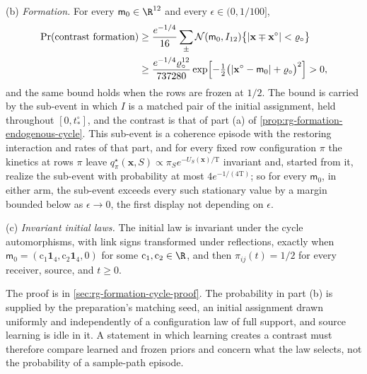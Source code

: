 (b) \emph{Formation.} For every \(\mathsf m_0\in\R^{12}\) and every
\(\epsilon\in(0,1/100]\),
\[
\begin{aligned}
\Pr(\text{contrast formation})
&\ge\frac{e^{-1/4}}{16}\sum_{\pm}\mathcal N(\mathsf m_0,I_{12})
\bigl\{|\mathbf x\mp\mathbf x^\circ|<\varrho_\circ\bigr\}\\
&\ge\frac{e^{-1/4}\varrho_\circ^{12}}{737280}
\exp\Bigl[-\tfrac12\bigl(|\mathbf x^\circ-\mathsf m_0|+\varrho_\circ\bigr)^2\Bigr]>0,
\end{aligned}
\]
and the same bound holds when the rows are frozen at \(1/2\). The bound is
carried by the sub-event in which \(I\) is a matched pair of the initial
assignment, held throughout \([0,t^\circ_*]\), and the contrast is that of
part (a) of \cref{prop:rg-formation-endogenous-cycle}. This sub-event is a
coherence episode with the restoring interaction and rates of that part, and
for every fixed row configuration \(\pi\) the kinetics at rows \(\pi\) leave
\(q^\star_\pi(\mathbf x,S)\propto\pi_Se^{-U_S(\mathbf x)/\mathrm T}\) invariant
and, started from it, realize the sub-event with probability at most
\(4e^{-1/(4\mathrm T)}\); so for every \(\mathsf m_0\), in either arm, the
sub-event exceeds every such stationary value by a margin bounded below as
\(\epsilon\to0\), the first display not depending on \(\epsilon\).

(c) \emph{Invariant initial laws.} The initial law is invariant under the cycle
automorphisms, with link signs transformed under reflections, exactly when
\(\mathsf m_0=(\mathrm c_1\mathbf 1_4,\mathrm c_2\mathbf 1_4,0)\) for some
\(\mathrm c_1,\mathrm c_2\in\R\), and then \(\pi_{ij}(t)=1/2\) for every
receiver, source, and \(t\ge0\).

The proof is in \cref{sec:rg-formation-cycle-proof}. The probability in part (b)
is supplied by the preparation's matching seed, an initial assignment drawn
uniformly and independently of a configuration law of full support, and source
learning is idle in it. A statement in which learning creates a contrast must
therefore compare learned and frozen priors and concern what the law selects,
not the probability of a sample-path episode.

